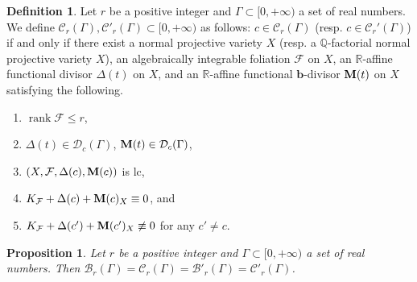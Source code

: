 \documentclass[11pt]{amsart}
\numberwithin{equation}{section}
\newcommand{\bb}{\bm{b}}
\newcommand{\Mm}{{\bf{M}}}
\newcommand{\Qq}{\mathbb{Q}}
\newcommand{\Rr}{\mathbb{R}}
\newcommand{\rk}{\operatorname{rank}}
\newcommand{\Ff}{\mathcal{F}}
\newcommand{\Ii}{\Gamma}
\newtheorem{prop}[thm]{Proposition}
\theoremstyle{definition}
\newtheorem{defn}[thm]{Definition}
\theoremstyle{definition}
\theoremstyle{definition}
\begin{document}
\begin{defn}
Let $r$ be a positive integer and  $\Ii\subset[0,+\infty)$ a set of real numbers. We define $\mathcal{C}_{r}(\Ii),\mathcal{C}'_{r}(\Ii)\subset [0,+\infty)$ as follows: $c\in\mathcal{C}_{r}(\Ii)$ (resp. $c\in\mathcal{C}_{r}'(\Ii)$) if and only if there exist a normal projective variety $X$ (resp. a $\Qq$-factorial normal projective variety $X$), an algebraically integrable foliation $\Ff$ on $X$, an $\Rr$-affine functional divisor $\Delta(t)$ on $X$, and an $\Rr$-affine functional $\bb$-divisor $\Mm(t)$ on $X$ satisfying the following.
\begin{enumerate}
	\item $\rk\Ff\le r$, 
	\item $\Delta(t)\in\mathcal{D}_{c}(\Ii)$, $\Mm(t)\in\mathcal{D}_c(\Ii)$,
	\item $(X,\Ff,\Delta(c),\Mm(c))$ is lc,
	\item $K_\Ff+\Delta(c)+\Mm(c)_X\equiv0$, and
	\item $K_\Ff+\Delta(c')+\Mm(c')_X\not\equiv 0$ for any $c'\not=c$.
\end{enumerate}
\end{defn}

\begin{prop}\label{prop: nak special set equal for foliation}
Let $r$ be a positive integer and $\Ii\subset[0,+\infty)$ a set of real numbers. Then $\mathcal{B}_r(\Ii)=\mathcal{C}_r(\Ii)=\mathcal{B}'_r(\Ii)=\mathcal{C}'_r(\Ii)$.
\end{prop}
\end{document}

